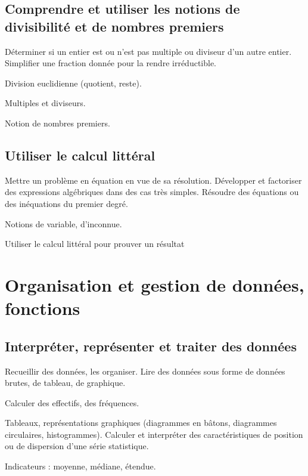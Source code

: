 \documentclass[11pt]{article}
\begin{document}
\subsection{Comprendre et utiliser les notions de divisibilité et de nombres premiers}

\begin{todolist}
    \item[\done] Déterminer si un entier est ou n’est pas multiple ou diviseur d’un autre entier. Simplifier une fraction donnée pour la rendre irréductible.
    \item Division euclidienne (quotient, reste).
    \item Multiples et diviseurs.
    \item[\done] Notion de nombres premiers.
\end{todolist}

\subsection{Utiliser le calcul littéral}

\begin{todolist}
    \item[\done] Mettre un problème en équation en vue de sa résolution. Développer et factoriser des expressions algébriques dans des cas très simples. Résoudre des équations ou des inéquations du premier degré.
    \item[\done] Notions de variable, d’inconnue.
    \item[\done] Utiliser le calcul littéral pour prouver un résultat
\end{todolist}

\section{Organisation et gestion de données, fonctions}

\subsection{Interpréter, représenter et traiter des données}

\begin{todolist}
    \item Recueillir des données, les organiser. Lire des données sous forme de données brutes, de tableau, de graphique.
    \item Calculer des effectifs, des fréquences.
    \item Tableaux, représentations graphiques (diagrammes en bâtons, diagrammes circulaires, histogrammes). Calculer et interpréter des caractéristiques de position ou de dispersion d’une série statistique.
    \item Indicateurs : moyenne, médiane, étendue.
\end{todolist}
\end{document}
